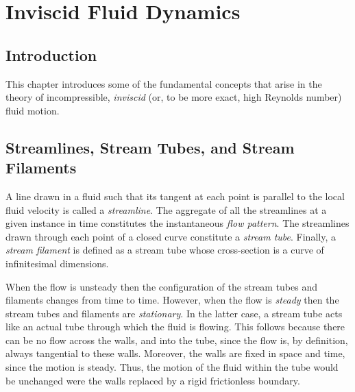 \chapter{Inviscid Fluid Dynamics}
\section{Introduction}
This  chapter introduces some of the fundamental concepts that arise in the theory
of incompressible, {\em inviscid}\/ (or, to be more exact, high Reynolds number) fluid motion.

\section{Streamlines,   Stream Tubes, and Stream Filaments}
A line drawn in a fluid such that its tangent at each point is parallel to the local fluid velocity is called
a {\em streamline}. The aggregate of all the streamlines at a given instance in time constitutes
the instantaneous {\em flow pattern}.
The streamlines drawn through each point of a closed curve constitute  a {\em stream tube}. Finally, a
{\em stream filament}\/ is defined as a stream tube whose cross-section is a curve of infinitesimal
dimensions. 

When the flow is unsteady then the configuration of the stream tubes and filaments changes from
time to time. However, when the flow is {\em steady}\/ then the stream tubes and filaments are
{\em stationary}. In the latter case, a stream tube acts like an actual tube through which the fluid
is flowing. This follows because there can be no flow across the walls, and into the tube, since the
flow is, by definition, always tangential to these walls. Moreover, the walls are fixed in space
and time, since the motion is steady. Thus, the motion of the fluid within the
tube would be unchanged were the walls replaced by a rigid  frictionless boundary. 


